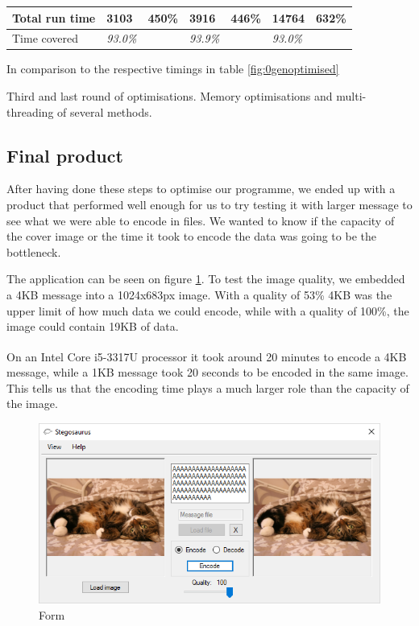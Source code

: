 \begin{threeparttable}[]
{\begin{tabular}{|p{2.8cm}|p{1.9cm}|p{1.4cm}|p{1.9cm}|p{1.4cm}|p{1.8cm}|p{1.5cm}|}
        Total run time  & \textbf{3103} & \textbf{450\%} & \textbf{3916} & \textbf{446\%} & \textbf{14764} & \textbf{632\%} \\ \hline
        Time covered    & \textit{93.0\%} &     & \textit{93.9\%} &     & \textit{93.0\%} &	\\ \hline
    \end{tabular}
    }
    \begin{tablenotes}
        \footnotesize{\item[\textdagger] In comparison to the respective timings in table \ref{fig:0genoptimised}}
    \end{tablenotes}
    \caption{Third and last round of optimisations. Memory optimisations and multi-threading of several methods.}
    \label{fig:3genoptimised}
\end{threeparttable}

\subsection{Final product}
After having done these steps to optimise our programme, we ended up with a product that performed well enough for us to try testing it with larger message to see what we were able to encode in files.
We wanted to know if the capacity of the cover image or the time it took to encode the data was going to be the bottleneck.

The application can be seen on figure \ref{fig:formApp}. To test the image quality, we embedded a 4KB message into a 1024x683px image. With a quality of 53\% 4KB was the upper limit of how much data we could encode, while with a quality of 100\%, the image could contain 19KB of data.

On an Intel{\textregistered} Core\textsuperscript{\texttrademark} i5-3317U processor it took around 20 minutes to encode a 4KB message, while a 1KB message took 20 seconds to be encoded in the same image. This tells us that the encoding time plays a much larger role than the capacity of the image.

\begin{figure}
	\centering
	\includegraphics[width=.7\textwidth]{figures/formShown.png}
	\caption{Form}
	\label{fig:formApp}
\end{figure}

